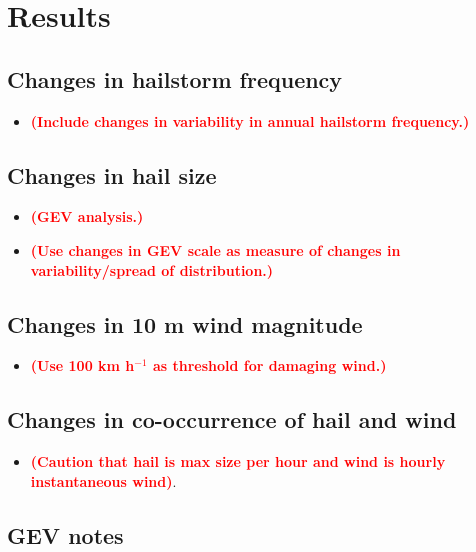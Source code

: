 \documentclass[]{agujournal2019}
\newcommand*{\todo}[1]{\textbf{\textcolor{red}{(#1)}}}
\begin{document}
\section{Results}
\label{sec:results}

\subsection{Changes in hailstorm frequency}

\begin{itemize}
\item \todo{Include changes in variability in annual hailstorm frequency.}
\end{itemize}

\subsection{Changes in hail size}

\begin{itemize}
\item \todo{GEV analysis.}
\item \todo{Use changes in GEV scale as measure of changes in variability/spread of distribution.}
\end{itemize}

\subsection{Changes in 10 m wind magnitude}

\begin{itemize}
\item \todo{Use 100 km h$^{-1}$ as threshold for damaging wind.}
\end{itemize}

\subsection{Changes in co-occurrence of hail and wind}

\begin{itemize}
\item \todo{Caution that hail is max size per hour and wind is hourly instantaneous wind}.
\end{itemize}

\subsection{GEV notes}
\end{document}
